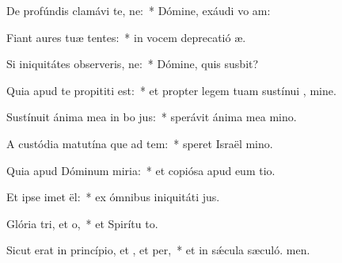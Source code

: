 \item De profúndis clamávi  te, ne:~* Dómine, exáudi vo am:
\item Fiant aures tuæ tentes:~* in vocem deprecatió æ.
\item Si iniquitátes observeris, ne:~* Dómine, quis susbit?
\item Quia apud te propititi est:~* et propter legem tuam sustínui , mine.
\item Sustínuit ánima mea in bo jus:~* sperávit ánima mea  mino.
\item A custódia matutína que ad tem:~* speret Israël  mino.
\item Quia apud Dóminum miria:~* et copiósa apud eum tio.
\item Et ipse imet ël:~* ex ómnibus iniquitáti jus.
\item Glória tri, et o,~* et Spirítu to.
\item Sicut erat in princípio, et , et per,~* et in sǽcula sæculó. men.
